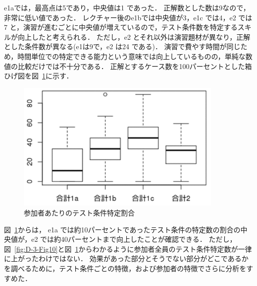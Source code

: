 e1aでは，最高点は5であり，中央値は1 であった．
正解数とした数は9なので，非常に低い値であった．
レクチャー後のe1bでは中央値が3，e1c では4，e2 では7 と，演習が進むごとに中央値が増えているので，テスト条件数を特定するスキルが向上したと考えられる．
ただし，e2 とそれ以外は演習題材が異なり，正解とした条件数が異なる(e1は9で，e2 は24 である)．
演習で費やす時間が同じため，時間単位での特定できる能力という意味では向上しているものの，単純な数値の比較だけでは不十分である．
正解とするケース数を100パーセントとした箱ひげ図を図~\ref{fig:D-3-Fig11}に示す．
\begin{figure}[htbp]
  \begin{center}
  \includegraphics[width=10cm]{./image/D-3-Fig11.png}
  \caption{参加者あたりのテスト条件特定割合}
  \label{fig:D-3-Fig11}
  \end{center}
   \end{figure}

図~\ref{fig:D-3-Fig11}からは， e1a では約10パーセントであったテスト条件の特定数の割合の中央値が，e2 では約40パーセントまで向上したことが確認できる．
ただし，図~\ref{fig:D-3-Fig10}と図~\ref{fig:D-3-Fig11}からわかるように参加者全員のテスト条件特定数が一律に上がったわけではない．
効果があった部分とそうでない部分がどこであるかを調べるために，テスト条件ごとの特徴，および参加者の特徴でさらに分析をすすめた．

